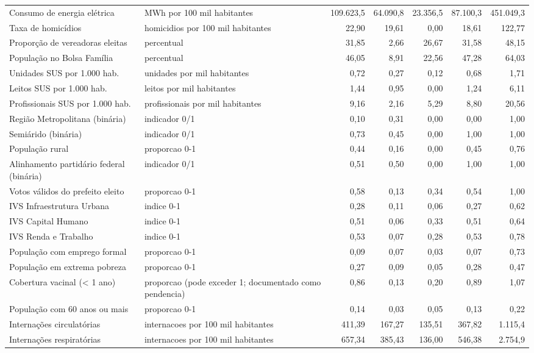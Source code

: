 \begin{table}[htbp]
\begin{tabular}{llrrrrr}
Consumo de energia elétrica & MWh por 100 mil habitantes & 109.623,5 & 64.090,8 & 23.356,5 & 87.100,3 & 451.049,3 \\
Taxa de homicídios & homicidios por 100 mil habitantes & 22,90 & 19,61 & 0,00 & 18,61 & 122,77 \\
Proporção de vereadoras eleitas & percentual & 31,85 & 2,66 & 26,67 & 31,58 & 48,15 \\
População no Bolsa Família & percentual & 46,05 & 8,91 & 22,56 & 47,28 & 64,03 \\
Unidades SUS por 1.000 hab. & unidades por mil habitantes & 0,72 & 0,27 & 0,12 & 0,68 & 1,71 \\
Leitos SUS por 1.000 hab. & leitos por mil habitantes & 1,44 & 0,95 & 0,00 & 1,24 & 6,11 \\
Profissionais SUS por 1.000 hab. & profissionais por mil habitantes & 9,16 & 2,16 & 5,29 & 8,80 & 20,56 \\
Região Metropolitana (binária) & indicador 0/1 & 0,10 & 0,31 & 0,00 & 0,00 & 1,00 \\
Semiárido (binária) & indicador 0/1 & 0,73 & 0,45 & 0,00 & 1,00 & 1,00 \\
População rural & proporcao 0-1 & 0,44 & 0,16 & 0,00 & 0,45 & 0,76 \\
Alinhamento partidário federal (binária) & indicador 0/1 & 0,51 & 0,50 & 0,00 & 1,00 & 1,00 \\
Votos válidos do prefeito eleito & proporcao 0-1 & 0,58 & 0,13 & 0,34 & 0,54 & 1,00 \\
IVS Infraestrutura Urbana & indice 0-1 & 0,28 & 0,11 & 0,06 & 0,27 & 0,62 \\
IVS Capital Humano & indice 0-1 & 0,51 & 0,06 & 0,33 & 0,51 & 0,64 \\
IVS Renda e Trabalho & indice 0-1 & 0,53 & 0,07 & 0,28 & 0,53 & 0,78 \\
População com emprego formal & proporcao 0-1 & 0,09 & 0,07 & 0,03 & 0,07 & 0,73 \\
População em extrema pobreza & proporcao 0-1 & 0,27 & 0,09 & 0,05 & 0,28 & 0,47 \\
Cobertura vacinal (< 1 ano) & proporcao (pode exceder 1; documentado como pendencia) & 0,86 & 0,13 & 0,20 & 0,89 & 1,07 \\
População com 60 anos ou mais & proporcao 0-1 & 0,14 & 0,03 & 0,05 & 0,13 & 0,22 \\
Internações circulatórias & internacoes por 100 mil habitantes & 411,39 & 167,27 & 135,51 & 367,82 & 1.115,4 \\
Internações respiratórias & internacoes por 100 mil habitantes & 657,34 & 385,43 & 136,00 & 546,38 & 2.754,9 \\

\end{tabular}
\end{table}
